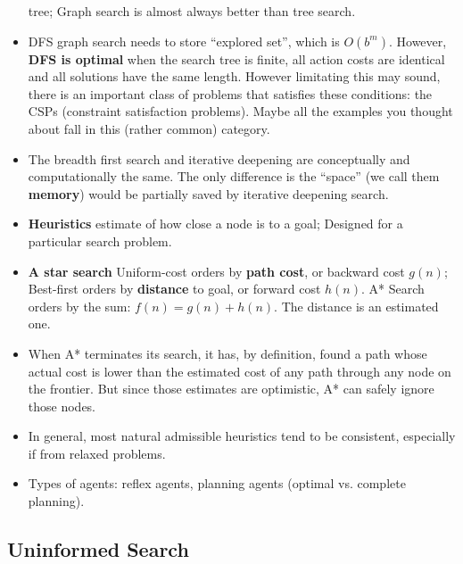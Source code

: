 \documentclass[twocolumn]{article}
\begin{document}
\begin{itemize}
  tree; Graph search is almost always better than tree search.
\item DFS graph search needs to store ``explored set'', which is
  $O(b^{m})$. However, \textbf{DFS is optimal} when the search tree is finite,
  all action costs are identical and all solutions have the same
  length. However limitating this may sound, there is an important
  class of problems that satisfies these conditions: the CSPs
  (constraint satisfaction problems). Maybe all the examples you
  thought about fall in this (rather common) category. 
\item The breadth first search and iterative deepening are
  conceptually and computationally the same. The only difference is
  the ``space'' (we call them \textbf{memory}) would be partially
  saved by iterative deepening search.
\item \textbf{Heuristics} estimate of how close a node is to a goal;
  Designed for a particular search problem. 
\item \textbf{A star search} Uniform-cost orders by \textbf{path cost}, or
  backward cost  $g(n)$; Best-first orders by \textbf{distance} to goal, or
  forward cost $h(n)$. A* Search orders by the sum:
  $f(n)=g(n)+h(n)$. The distance is an estimated one.
\item When A* terminates its search, it has, by definition, found a
  path whose actual cost is lower than the estimated cost of any path
  through any node on the frontier. But since those estimates are
  optimistic, A* can safely ignore those nodes.
\item In general, most natural admissible heuristics tend to be
  consistent, especially if from relaxed problems. 
\item Types of agents: reflex agents, planning agents (optimal
  vs. complete planning).
\end{itemize}

\subsection{Uninformed Search}
\label{sec:uninformed-search}
\end{document}
